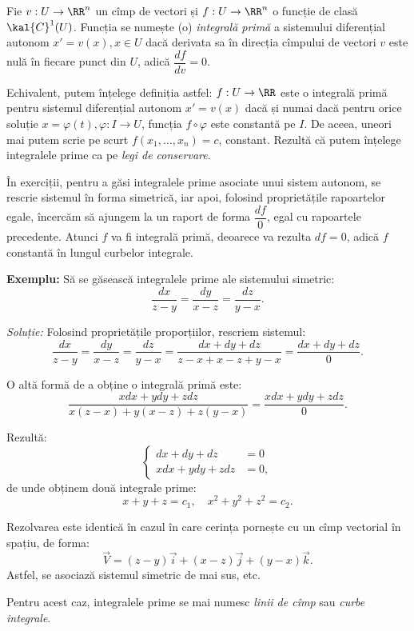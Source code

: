 \begin{definition}\label{def:int-prim}
  Fie $ v : U \to \RR^n $ un cîmp de vectori și $ f : U \to \RR^n $ o funcție
  de clasă $ \kal{C}^1(U) $. Funcția se numește (o) \emph{integrală primă} a
  sistemului diferențial autonom $ x' = v(x), x \in U $ dacă derivata sa
  în direcția cîmpului de vectori $ v $ este nulă în fiecare punct din
  $ U $, adică $ \dfrac{df}{dv} = 0 $.
\end{definition}

Echivalent, putem înțelege definiția astfel: $ f : U \to \RR $ este o
integrală primă pentru sistemul diferențial autonom $ x' = v(x) $ dacă
și numai dacă pentru orice soluție $ x = \varphi(t), \varphi : I \to U $,
funcția $ f \circ \varphi $ este constantă pe $ I $. De aceea, uneori
mai putem scrie pe scurt $ f(x_1, \dots, x_n) = c $, constant. Rezultă
că putem înțelege integralele prime ca pe \emph{legi de conservare}.

În exerciții, pentru a găsi integralele prime asociate unui sistem autonom,
se rescrie sistemul în forma simetrică, iar apoi, folosind proprietățile rapoartelor
egale, încercăm să ajungem la un raport de forma $ \dfrac{df}{0} $, egal cu
rapoartele precedente. Atunci $ f $ va fi integrală primă, deoarece va
rezulta $ df = 0 $, adică $ f $ constantă în lungul curbelor integrale.

\textbf{Exemplu:} Să se găsească integralele prime ale sistemului simetric:
\[
  \dfrac{dx}{z - y} = \dfrac{dy}{x - z} = \dfrac{dz}{y - x}.
\]

\emph{Soluție:} Folosind proprietățile proporțiilor, rescriem sistemul:
\[
  \dfrac{dx}{z - y} = \dfrac{dy}{x - z} = \dfrac{dz}{y - x} = %
  \dfrac{dx + dy + dz}{z - x + x - z + y - x} = %
  \dfrac{dx + dy + dz}{0}.
\]

O altă formă de a obține o integrală primă este:
\[
  \dfrac{xdx + ydy + zdz}{x(z - x) + y(x - z) + z(y - x)} = %
  \dfrac{xdx + ydy + zdz}{0}.
\]

Rezultă:
\[
  \begin{cases}
    dx + dy + dz &= 0 \\
    xdx + ydy + zdz &= 0,
  \end{cases}
\]
de unde obținem două integrale prime:
\[
  x + y + z = c_1, \quad x^2 + y^2 + z^2 = c_2.
\]

\begin{remark}\label{rk:sist-cimp}
  Rezolvarea este identică în cazul în care cerința pornește cu un
  cîmp vectorial în spațiu, de forma:
  \[
    \vec{V} = (z - y)\vec{i} + (x - z)\vec{j} + (y - x) \vec{k}.
  \]
  Astfel, se asociază sistemul simetric de mai sus, etc.

  Pentru acest caz, integralele prime se mai numesc \emph{linii de cîmp}
  sau \emph{curbe integrale}.
\end{remark}

